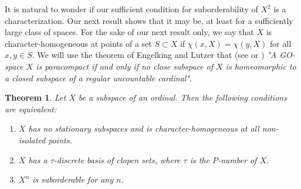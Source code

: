 \documentclass[12pt]{amsart}
\newtheorem{thm}{Theorem}[section]
\begin{document}
It is natural to wonder if  our sufficient condition for suborderability of $X^2$ is  a characterization. Our next result shows that it may be, at least for a sufficiently large class of spaces. For the sake of our next result only, we say that $X$ is 
character-homogeneous at points of a set $S\subset X$ if $\chi(x,X)=\chi(y,X)$ for all  $x,y\in S$. We will use the theorem of Engelking and Lutzer that (see \cite{BL} or \cite{Lut}) {\it "A GO-space $X$ is paracompact if and only if no close subspace of $X$ is homeomorphic to a closed subspace of a regular uncountable cardinal"}. 
\par\bigskip\noindent
\begin{thm}\label{thm:ordinal}
Let $X$ be a subspace of an ordinal. Then the following conditions are equivalent:
\begin{enumerate}
	\item $X$ has no stationary subspaces and is character-homogeneous at all non-isolated points.
\item $X$ has a $\tau$-discrete basis of clopen sets, where $\tau$ is the $P$-number of $X$.
	\item $X^n$ is suborderable for any $n$.
\end{enumerate}
\end{thm}
\end{document}

